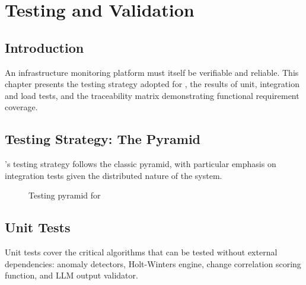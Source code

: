 \chapter{Testing and Validation}

\section*{Introduction}

An infrastructure monitoring platform must itself be verifiable and reliable.
This chapter presents the testing strategy adopted for \caimp{}, the results of
unit, integration and load tests, and the traceability matrix demonstrating
functional requirement coverage.

\section{Testing Strategy: The Pyramid}

\caimp{}'s testing strategy follows the classic pyramid, with particular emphasis
on integration tests given the distributed nature of the system.

\begin{figure}[H]
\centering
{}
\caption{Testing pyramid for \caimp{}}
\label{fig:pyramid}
\end{figure}

\section{Unit Tests}

Unit tests cover the critical algorithms that can be tested without external
dependencies: anomaly detectors, Holt-Winters engine, change correlation scoring
function, and LLM output validator.

